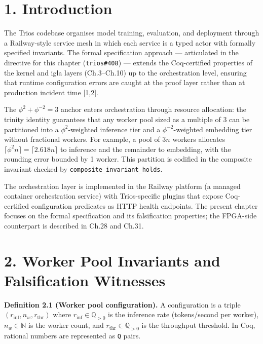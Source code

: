 \section{1. Introduction}\label{fa_22:introduction}

The Trios codebase organises model training,
evaluation, and deployment through a Railway-style
service mesh in which each service is a typed
actor with formally specified invariants. The
formal specification approach --- articulated in
the directive for this chapter
(\texttt{trios\#408}) --- extends the
Coq-certified properties of the kernel and igla
layers (Ch.3--Ch.10) up to the orchestration
level, ensuring that runtime configuration errors
are caught at the proof layer rather than at
production incident time [1,2].

The \(\phi^2 + \phi^{-2} = 3\) anchor enters
orchestration through resource allocation: the
trinity identity guarantees that any worker pool
sized as a multiple of 3 can be partitioned into a
\(\phi^2\)-weighted inference tier and a
\(\phi^{-2}\)-weighted embedding tier without
fractional workers. For example, a pool of \(3n\)
workers allocates
\(\lceil \phi^2 n \rceil = \lceil 2.618 n \rceil\)
to inference and the remainder to embedding, with
the rounding error bounded by 1 worker. This
partition is codified in the composite invariant
checked by \texttt{composite\_invariant\_holds}.

The orchestration layer is implemented in the
Railway platform (a managed container
orchestration service) with Trios-specific plugins
that expose Coq-certified configuration predicates
as HTTP health endpoints. The present chapter
focuses on the formal specification and its
falsification properties; the FPGA-side
counterpart is described in Ch.28 and Ch.31.

\section{2. Worker Pool Invariants and
Falsification
Witnesses}\label{fa_22:worker-pool-invariants-and-falsification-witnesses}

\textbf{Definition 2.1 (Worker pool
configuration).} A configuration is a triple
\((r_\text{inf}, n_w, r_\text{thr})\) where
\(r_\text{inf} \in \mathbb{Q}_{>0}\) is the
inference rate (tokens/second per worker),
\(n_w \in \mathbb{N}\) is the worker count, and
\(r_\text{thr} \in \mathbb{Q}_{>0}\) is the
throughput threshold. In Coq, rational numbers are
represented as \texttt{Q} pairs.

